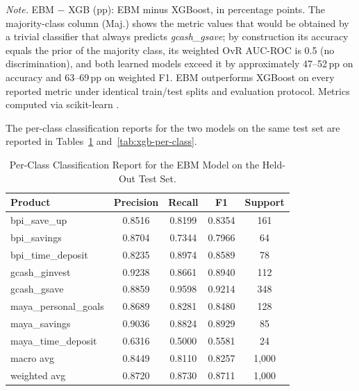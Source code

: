 \documentclass{icsthesis}
\begin{document}
\begin{mainmatter}
\begin{table}[h]
					\vspace{0.5em}
					\raggedright\scriptsize \emph{Note.} EBM $-$ XGB (pp): EBM minus XGBoost, in percentage points. The majority-class column (Maj.) shows the metric values that would be obtained by a trivial classifier that always predicts \emph{gcash\_gsave}; by construction its accuracy equals the prior of the majority class, its weighted OvR AUC-ROC is 0.5 (no discrimination), and both learned models exceed it by approximately 47--52\,pp on accuracy and 63--69\,pp on weighted F1. EBM outperforms XGBoost on every reported metric under identical train/test splits and evaluation protocol. Metrics computed via scikit-learn \cite{ref74}.
					\vspace{4ex}
					\end{table}

					The per-class classification reports for the two models on the same test set are reported in Tables~\ref{tab:ebm-per-class} and~\ref{tab:xgb-per-class}.

					\begin{table}[h]
					\vspace{4ex}
					\centering
					\caption{Per-Class Classification Report for the EBM Model on the Held-Out Test Set.}
					\label{tab:ebm-per-class}
					\footnotesize
					\begin{tabular}{|l|c|c|c|c|}
						\hline
						\textbf{Product} & \textbf{Precision} & \textbf{Recall} & \textbf{F1} & \textbf{Support} \\
						\hline
						bpi\_save\_up & 0.8516 & 0.8199 & 0.8354 & 161 \\
						bpi\_savings & 0.8704 & 0.7344 & 0.7966 & 64 \\
						bpi\_time\_deposit & 0.8235 & 0.8974 & 0.8589 & 78 \\
						gcash\_ginvest & 0.9238 & 0.8661 & 0.8940 & 112 \\
						gcash\_gsave & 0.8859 & 0.9598 & 0.9214 & 348 \\
						maya\_personal\_goals & 0.8689 & 0.8281 & 0.8480 & 128 \\
						maya\_savings & 0.9036 & 0.8824 & 0.8929 & 85 \\
						maya\_time\_deposit & 0.6316 & 0.5000 & 0.5581 & 24 \\
						\hline
						macro avg & 0.8449 & 0.8110 & 0.8257 & 1{,}000 \\
						weighted avg & 0.8720 & 0.8730 & 0.8711 & 1{,}000 \\
						\hline
					\end{tabular}
					\vspace{4ex}
					\end{table}


\end{mainmatter}
\end{document}

